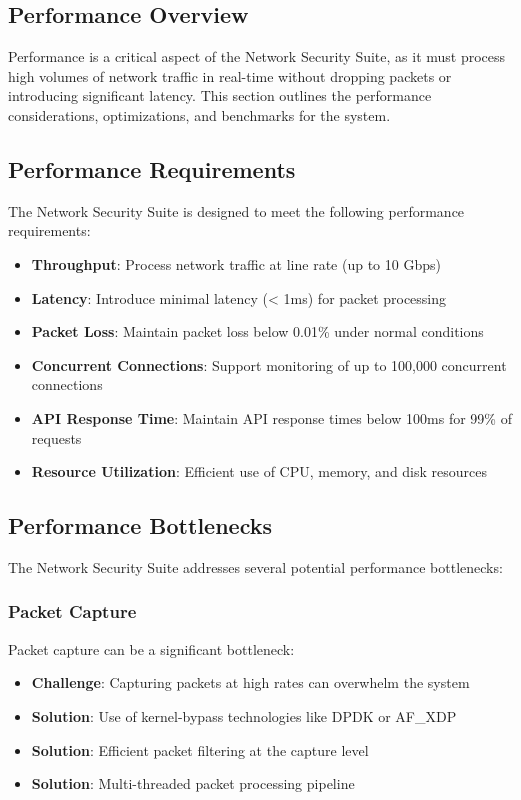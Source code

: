 \subsection{Performance Overview}
Performance is a critical aspect of the Network Security Suite, as it must process high volumes of network traffic in real-time without dropping packets or introducing significant latency. This section outlines the performance considerations, optimizations, and benchmarks for the system.

\subsection{Performance Requirements}
The Network Security Suite is designed to meet the following performance requirements:

\begin{itemize}
    \item \textbf{Throughput}: Process network traffic at line rate (up to 10 Gbps)
    \item \textbf{Latency}: Introduce minimal latency (< 1ms) for packet processing
    \item \textbf{Packet Loss}: Maintain packet loss below 0.01\% under normal conditions
    \item \textbf{Concurrent Connections}: Support monitoring of up to 100,000 concurrent connections
    \item \textbf{API Response Time}: Maintain API response times below 100ms for 99\% of requests
    \item \textbf{Resource Utilization}: Efficient use of CPU, memory, and disk resources
\end{itemize}

\subsection{Performance Bottlenecks}
The Network Security Suite addresses several potential performance bottlenecks:

\subsubsection{Packet Capture}
Packet capture can be a significant bottleneck:

\begin{itemize}
    \item \textbf{Challenge}: Capturing packets at high rates can overwhelm the system
    \item \textbf{Solution}: Use of kernel-bypass technologies like DPDK or AF\_XDP
    \item \textbf{Solution}: Efficient packet filtering at the capture level
    \item \textbf{Solution}: Multi-threaded packet processing pipeline
\end{itemize}

